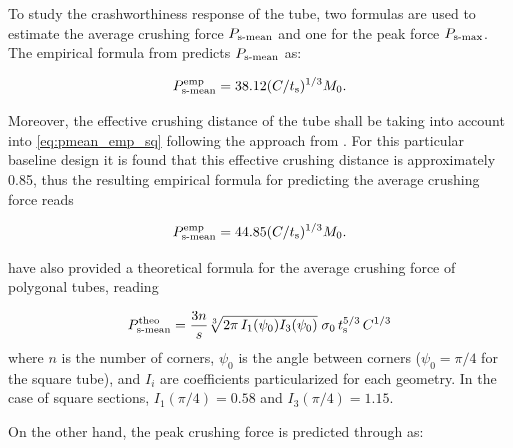 \documentclass[12pt,number,preprint,review,times]{elsarticle}
\begin{document}
To study the crashworthiness response of the tube, two formulas are used to estimate the average crushing force $P_{\mathrm{s{\text -}mean}}$ and one for the peak force $P_{\mathrm{s{\text -}max}}$. The empirical formula from \citet{Abramowicz1984179} predicts $P_{\mathrm{s{\text -}mean}}$ as:

\begin{equation}
\centering
    P^{\mathrm{emp}}_{\mathrm{s{\text -}mean}} = 38.12 (C / t_\mathrm{s})^{1/3} M_0.
\label{eq:pmean_emp_sq}
\end{equation}

Moreover, the effective crushing distance of the tube shall be taking into account into \cref{eq:pmean_emp_sq} following the approach from \citet{Wlodzimier-1983}. For this particular baseline design it is found that this effective crushing distance is approximately 0.85, thus the resulting empirical formula for predicting the average crushing force reads

\begin{equation}
\centering
    P^{\mathrm{emp}}_{\mathrm{s{\text -}mean}} = 44.85 (C / t_\mathrm{s})^{1/3} M_0.
\label{eq:pmean_emp_sq2}
\end{equation}

\citet{wierzbicki1983crushing} have also provided a theoretical formula for the average crushing force of polygonal tubes, reading

\begin{equation}
\centering
    P^{\mathrm{theo}}_{\mathrm{s{\text -}mean}} =  \frac{3 n}{s} \sqrt[3]{2 \pi \, I_{1}(\psi_0) I_{3}(\psi_0)} \; \sigma_0 \, t_\mathrm{s}^{5/3} \, C^{1/3} %
\label{eq:pmean_theo_sq}
\end{equation}
where $n$ is the number of corners, $\psi_0$ is the angle between corners ($\psi_0 = \pi / 4$ for the square tube), and  $I_{i}$ are coefficients particularized for each geometry. In the case of square sections, $I_{1}(\pi / 4) = 0.58$ and $I_{3}(\pi / 4) = 1.15$.

On the other hand, the peak crushing force is predicted through \citet{timoshenko2009theory} as:
\end{document}
